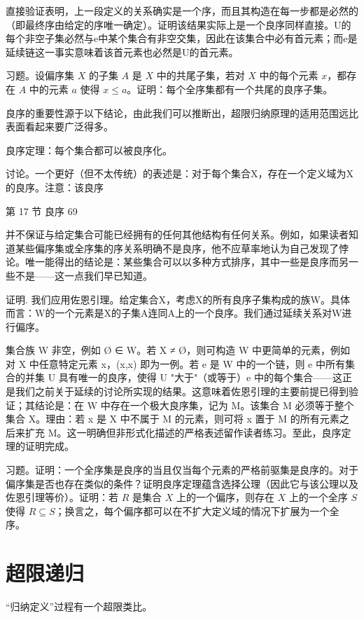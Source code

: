 \documentclass[12pt,a4paper]{ctexbook}
\theoremstyle{definition}
\theoremstyle{remark}
\begin{document}
{直接验证表明，上一段定义的关系确实是一个序，而且其构造在每一步都是必然的（即最终序由给定的序唯一确定）。证明该结果实际上是一个良序同样直接。U的每个非空子集必然与e中某个集合有非空交集，因此在该集合中必有首元素；而e是延续链这一事实意味着该首元素也必然是U的首元素。

习题。设偏序集 \(X\) 的子集 \(A\) 是 \(X\) 中的共尾子集，若对 \(X\) 中的每个元素 \(x\)，都存在 \(A\) 中的元素 \(a\) 使得 \(x \leq a\)。证明：每个全序集都有一个共尾的良序子集。

良序的重要性源于以下结论，由此我们可以推断出，超限归纳原理的适用范围远比表面看起来要广泛得多。

良序定理：每个集合都可以被良序化。

讨论。一个更好（但不太传统）的表述是：对于每个集合X，存在一个定义域为X的良序。注意：该良序

第 17 节 良序 69

并不保证与给定集合可能已经拥有的任何其他结构有任何关系。例如，如果读者知道某些偏序集或全序集的序关系明确不是良序，他不应草率地认为自己发现了悖论。唯一能得出的结论是：某些集合可以以多种方式排序，其中一些是良序而另一些不是——这一点我们早已知道。

证明. 我们应用佐恩引理。给定集合X，考虑X的所有良序子集构成的族W。具体而言：W的一个元素是X的子集A连同A上的一个良序。我们通过延续关系对W进行偏序。

集合族 W 非空，例如 Ø ∈ W。若 X ≠ Ø，则可构造 W 中更简单的元素，例如对 X 中任意特定元素 x，{(x,x)} 即为一例。若 e 是 W 中的一个链，则 e 中所有集合的并集 U 具有唯一的良序，使得 U "大于"（或等于）e 中的每个集合——这正是我们之前关于延续的讨论所实现的结果。这意味着佐恩引理的主要前提已得到验证；其结论是：在 W 中存在一个极大良序集，记为 M。该集合 M 必须等于整个集合 X。理由：若 x 是 X 中不属于 M 的元素，则可将 x 置于 M 的所有元素之后来扩充 M。这一明确但非形式化描述的严格表述留作读者练习。至此，良序定理的证明完成。

习题。证明：一个全序集是良序的当且仅当每个元素的严格前驱集是良序的。对于偏序集是否也存在类似的条件？证明良序定理蕴含选择公理（因此它与该公理以及佐恩引理等价）。证明：若 \( R \) 是集合 \( X \) 上的一个偏序，则存在 \( X \) 上的一个全序 \( S \) 使得 \( R \subseteq S \)；换言之，每个偏序都可以在不扩大定义域的情况下扩展为一个全序。


\chapter{超限递归}

“归纳定义”过程有一个超限类比。

}
\end{document}
